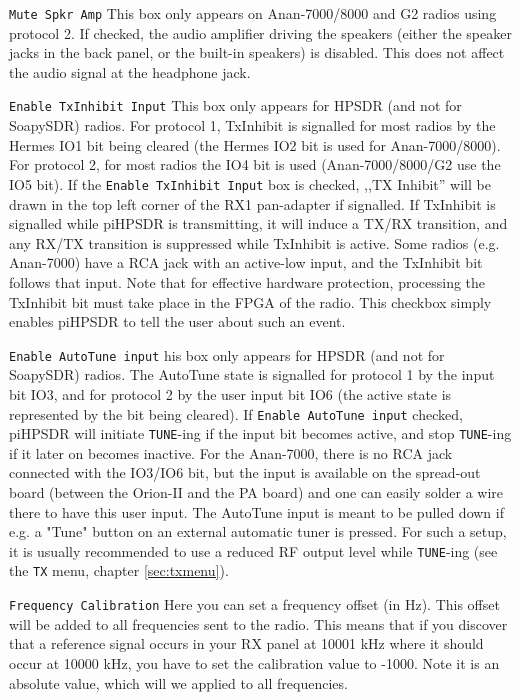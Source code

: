 \documentclass[12pt]{book}
\def\rett#1{\texttt{\color{red}#1}}
\def\bltt#1{\texttt{\color{blue}#1}}
\def\pH{pi\-HPSDR }
\begin{document}
\rett{Mute Spkr Amp} This box only appears on Anan-7000/8000 and G2 radios using protocol 2.
If checked, the audio amplifier driving the speakers (either the speaker jacks in the
back panel, or the built-in speakers) is disabled. This does not affect the audio signal
at the headphone jack.

\rett{Enable TxInhibit Input} This box only appears for HPSDR (and not for SoapySDR)
radios.
For  protocol 1, TxInhibit is signalled for most radios by the Hermes IO1 bit being
cleared (the Hermes IO2 bit is used for Anan-7000/8000). For protocol 2, for most
radios the IO4 bit is used (Anan-7000/8000/G2 use the IO5 bit).
If the \rett{Enable TxInhibit Input} box is checked, ,,TX Inhibit'' will be drawn
in the top left corner of the RX1 pan-adapter if signalled. If TxInhibit is signalled
while \pH is transmitting, it will induce a TX/RX transition, and any RX/TX
transition is suppressed while TxInhibit is active. Some radios (e.g. Anan-7000) have
a RCA jack with an active-low input, and the TxInhibit bit follows that input.
Note that for effective hardware protection, processing the TxInhibit bit must
take place in the FPGA of the radio. This checkbox simply enables \pH to tell
the user about such an event.

\rett{Enable AutoTune  input} his box only appears for HPSDR (and not for SoapySDR)
radios. The AutoTune state is signalled for protocol 1 by the input bit IO3,
and for protocol 2 by the user input bit IO6 (the active state is represented
by the bit being cleared).
If \rett{Enable AutoTune  input} checked, \pH will initiate \bltt{TUNE}-ing if the
input bit becomes active, and stop \bltt{TUNE}-ing if it later on becomes inactive.
For the Anan-7000, there is no RCA jack connected with the IO3/IO6 bit, but the
input is available on the spread-out board (between the Orion-II and the PA board) and one
can easily solder a wire there to have this user input. The AutoTune input is meant to
be pulled down if e.g. a "Tune" button on an external automatic tuner is pressed.
For such a setup, it is usually recommended to use a reduced RF output level while
\bltt{TUNE}-ing  (see the \bltt{TX} menu, chapter \ref{sec:txmenu}).


\rett{Frequency Calibration} Here you can set a frequency offset (in Hz). This offset
will be added to all frequencies sent to the radio. This means that if you discover that
a reference signal occurs in your RX panel at 10001 kHz where it should occur at 10000
kHz, you have to set the calibration value to -1000. Note it is an absolute value,
which will we applied to all frequencies.
\end{document}
